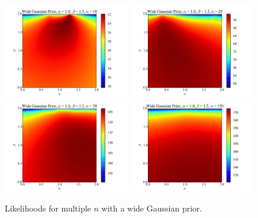 \documentclass{article}
\theoremstyle{definition}
\begin{document}
\begin{figure}\centering
    \includegraphics[width=0.49\textwidth]{lh2d_5.pdf}
    \includegraphics[width=0.49\textwidth]{lh2d_6.pdf}
    \\
    \includegraphics[width=0.49\textwidth]{lh2d_7.pdf}
    \includegraphics[width=0.49\textwidth]{lh2d_8.pdf}
    \caption{\label{2d_widegauss}Likelihoods for multiple $n$ with a wide
    Gaussian prior.}
\end{figure}
\end{document}

